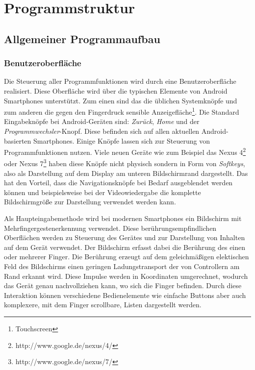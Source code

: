 \section{Programmstruktur}

\subsection{Allgemeiner Programmaufbau}

\subsubsection{Benutzeroberfläche}

Die Steuerung aller Programmfunktionen wird durch eine Benutzeroberfläche realisiert. Diese Oberfläche wird über die typischen Elemente von Android Smartphones unterstützt. Zum einen sind das die üblichen Systemknöpfe und zum anderen die gegen den Fingerdruck sensible Anzeigefläche\footnote{Touchscreen}. Die Standard Eingabeknöpfe bei Android-Geräten sind: \textit{Zurück}, \textit{Home} und der \textit{Programmwechsler}-Knopf. Diese befinden sich auf allen aktuellen Android-basierten Smartphones. Einige Knöpfe lassen sich zur Steuerung von Programmfunktionen nutzen. Viele neuen Geräte wie zum Beispiel das Nexus 4\footnote{http://www.google.de/nexus/4/} oder Nexus 7\footnote{http://www.google.de/nexus/7/} haben diese Knöpfe nicht physisch sondern in Form von \emph{Softkeys}, also als Darstellung auf dem Display am unteren Bildschirmrand dargestellt. Das hat den Vorteil, dass die Navigationsknöpfe bei Bedarf ausgeblendet werden können und beispielsweise bei der Videowiedergabe die komplette Bildschirmgröße zur Darstellung verwendet werden kann.

Als Haupteingabemethode wird bei modernen Smartphones ein Bildschirm mit Mehrfingergestenerkennung verwendet. Diese berührungsempfindlichen Oberflächen werden zu Steuerung des Gerätes und zur Darstellung von Inhalten auf dem Gerät verwendet. Der Bildschirm erfasst dabei die Berührung des einen oder mehrerer Finger. Die Berührung erzeugt auf dem geleichmäßigen elektischen Feld des Bildschirms einen geringen Ladungstransport der von Controllern am Rand erkannt wird. Diese Impulse werden in Koordinaten umgerechnet, wodurch das Gerät genau nachvollziehen kann, wo sich die Finger befinden. Durch diese Interaktion können verschiedene Bedienelemente wie einfache Buttons aber auch komplexere, mit dem Finger scrollbare, Listen dargestellt werden.


